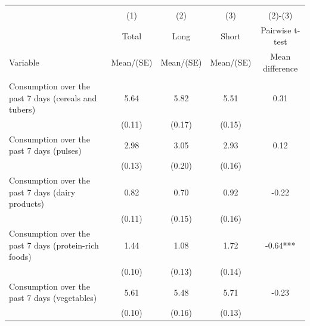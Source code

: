 
\begin{tabular}{@{\extracolsep{5pt}}lcccc}
\\[-1.8ex]\hline \hline \\[-1.8ex]
 & \multicolumn{1}{c}{(1)}  & \multicolumn{1}{c}{(2)}  & \multicolumn{1}{c}{(3)}  & \multicolumn{1}{c}{(2)-(3)} \\
 & \multicolumn{1}{c}{Total}  & \multicolumn{1}{c}{Long}  & \multicolumn{1}{c}{Short}  & \multicolumn{1}{c}{Pairwise t-test}  \\
Variable & Mean/(SE) & Mean/(SE) & Mean/(SE) & Mean difference \\ \hline \\[-1.8ex] 
Consumption over the past 7 days (cereals and tubers)   & 5.64    & 5.82    & 5.51    & 0.31   \\
 & (0.11)  & (0.17)  & (0.15)  &  \\ [1ex]
Consumption over the past 7 days (pulses)   & 2.98    & 3.05    & 2.93    & 0.12   \\
 & (0.13)  & (0.20)  & (0.16)  &  \\ [1ex]
Consumption over the past 7 days (dairy products)   & 0.82    & 0.70    & 0.92    & -0.22   \\
 & (0.11)  & (0.15)  & (0.16)  &  \\ [1ex]
Consumption over the past 7 days (protein-rich foods)   & 1.44    & 1.08    & 1.72    & -0.64***   \\
 & (0.10)  & (0.13)  & (0.14)  &  \\ [1ex]
Consumption over the past 7 days (vegetables)   & 5.61    & 5.48    & 5.71    & -0.23   \\
 & (0.10)  & (0.16)  & (0.13)  &  \\ [1ex]

\end{tabular}

